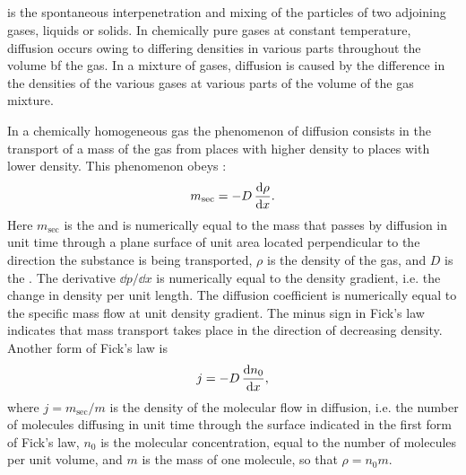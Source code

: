 \subsection{}\label{10.8.3}  is the spontaneous interpenetration and mixing of the particles of two adjoining gases, liquids or solids. In chemically pure gases at constant temperature, diffusion occurs owing to differing densities in various parts throughout the volume bf the gas. In a mixture of gases, diffusion is caused by the difference in the densities of the various gases at various parts of the volume of the gas mixture.

In a chemically homogeneous gas the phenomenon of diffusion consists in the transport of a mass of the gas from places with higher density to places with lower density. This phenomenon obeys :
\begin{equation*}%
m_{\text{sec}} = - D \, \dv{\rho}{x}.
\end{equation*}
Here $m_{\text{sec}}$ is the  and is numerically equal to the mass that passes by diffusion in unit time through a plane surface of unit area located perpendicular to the direction the substance is being transported, $\rho$ is the density of the gas, and $D$ is the . The derivative $\dd p / \dd x$ is numer­ically equal to the density gradient, i.e. the change in density per unit length. The diffusion coefficient is numerically equal to the specific mass flow at unit density gradient. The minus sign in Fick's law indicates that mass transport takes place in the direction of decreasing density.
Another form of Fick's law is
\begin{equation*}%
j  = - D \, \dv{n_{0}}{x},
\end{equation*}
where $j = m_{\text{sec}}/m$ is the density of the molecular flow in diffusion, i.e. the number of molecules diffusing in unit time through the surface indicated in the first form of Fick's law, $n_{0}$ is the molecular concentration, equal to the number of molecules per unit volume, and $m$ is the mass of one molecule, so that $\rho = n_{0} m$.

